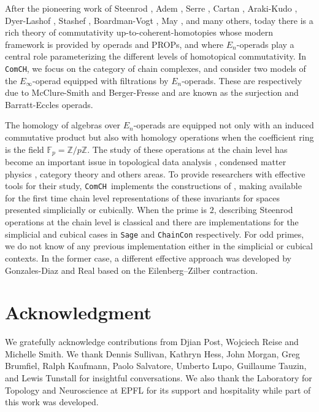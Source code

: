 \documentclass{amsart}
\newcommand{\comch}{\texttt{ComCH}}
\begin{document}
After the pioneering work of Steenrod \cite{Steenrod47, Steenrod62}, Adem \cite{Adem52}, Serre \cite{Serre53}, Cartan \cite{Cartan55}, Araki-Kudo \cite{ArakiKudo56}, Dyer-Lashof \cite{DyerLashof62}, Stashef \cite{Stasheff63}, Boardman-Vogt \cite{BoardmanVogt73}, May \cite{May70algebraic, May72geometry}, and many others, today there is a rich theory of commutativity up-to-coherent-homotopies whose modern framework is provided by operads and PROPs, and where $E_n$-operads play a central role parameterizing the different levels of homotopical commutativity. In \comch, we focus on the category of chain complexes, and consider two models of the $E_\infty$-operad equipped with filtrations by $E_n$-operads. These are respectively due to McClure-Smith \cite{McClureSmith03} and Berger-Fresse \cite{BergerFresse04} and are known as the surjection and Barratt-Eccles operads.

The homology of algebras over $E_n$-operads are equipped not only with an induced commutative product but also with homology operations when the coefficient ring is the field $\mathbb F_p = \mathbb Z/ p\mathbb Z$.
The study of these operations at the chain level has become an important issue in topological data analysis \cite{medina2018persistence}, condensed matter physics \cite{Kapustin2017}, category theory \cite{medina2020globular} and others areas. To provide researchers with effective tools for their study, \comch\, implements the constructions of \cite{medina2020chain}, making available for the first time chain level representations of these invariants for spaces presented simplicially or cubically. When the prime is $2$, describing Steenrod operations at the chain level is classical and there are implementations for the simplicial \cite{GonReal1999} and cubical \cite{Pilarczyk2016} cases in \texttt{Sage} \cite{sage} and \texttt{ChainCon} \cite{chaincon} respectively. For odd primes, we do not know of any previous implementation either in the simplicial or cubical contexts. In the former case, a different effective approach was developed by Gonzales-Diaz and Real \cite{GonReal2003, GonReal2005} based on the Eilenberg–Zilber contraction.

\section*{Acknowledgment}
We gratefully acknowledge contributions from Djian Post, Wojciech Reise and Michelle Smith. We thank Dennis Sullivan, Kathryn Hess, John Morgan, Greg Brumfiel, Ralph Kaufmann, Paolo Salvatore, Umberto Lupo, Guillaume Tauzin, and Lewis Tunstall for insightful conversations. We also thank the Laboratory for Topology and Neuroscience at EPFL for its support and hospitality while part of this work was developed.
\end{document}
